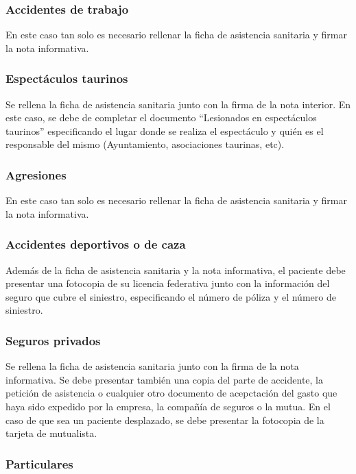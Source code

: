 \subsubsection{Accidentes de trabajo}

En este caso tan solo es necesario rellenar la ficha de asistencia sanitaria y firmar la nota informativa.

\subsubsection{Espectáculos taurinos}

Se rellena la ficha de asistencia sanitaria junto con la firma de la nota interior.
En este caso, se debe de completar el documento ``Lesionados en espectáculos taurinos'' especificando el lugar donde se realiza el espectáculo y quién es el responsable del mismo (Ayuntamiento, asociaciones taurinas, etc).

\subsubsection{Agresiones}

En este caso tan solo es necesario rellenar la ficha de asistencia sanitaria y firmar la nota informativa.

\subsubsection{Accidentes deportivos o de caza}

Además de la ficha de asistencia sanitaria y la nota informativa, el paciente debe presentar una fotocopia de su licencia federativa junto con la información del seguro que cubre el siniestro, especificando el número de póliza y el número de siniestro.

\subsubsection{Seguros privados}

Se rellena la ficha de asistencia sanitaria junto con la firma de la nota informativa.
Se debe presentar también una copia del parte de accidente, la petición de asistencia o cualquier otro documento de acepctación del gasto que haya sido expedido por la empresa, la compañía de seguros o la mutua.
En el caso de que sea un paciente desplazado, se debe presentar la fotocopia de la tarjeta de mutualista.

\subsubsection{Particulares}

